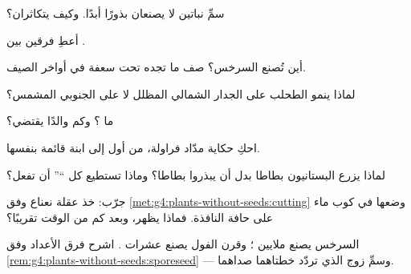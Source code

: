 \begin{exercise}[$\star$]\label{exo:g4:plants-without-seeds:1}
سمِّ نباتين لا يصنعان بذورًا أبدًا. وكيف يتكاثران؟
\end{exercise}

\begin{exercise}[$\star$]\label{exo:g4:plants-without-seeds:2}
أعطِ فرقين بين  .
\end{exercise}

\begin{exercise}[$\star$]\label{exo:g4:plants-without-seeds:3}
أين تُصنع  السرخس؟ صف ما تجده تحت سعفة في أواخر الصيف.
\end{exercise}

\begin{exercise}[$\star$]\label{exo:g4:plants-without-seeds:4}
لماذا ينمو الطحلب على الجدار الشمالي المظلل لا على الجنوبي
المشمس؟
\end{exercise}

\begin{exercise}[$\star$]\label{exo:g4:plants-without-seeds:5}
ما ؟ وكم والدًا يقتضي؟
\end{exercise}

\begin{exercise}[$\star$]\label{exo:g4:plants-without-seeds:6}
احكِ حكاية مدّاد فراولة، من أول  إلى  ابنة قائمة بنفسها.
\end{exercise}

\begin{exercise}[$\star$]\label{exo:g4:plants-without-seeds:7}
لماذا يزرع البستانيون بطاطا بدل أن يبذروا  بطاطا؟ وماذا
تستطيع كل ``'' أن تفعل؟
\end{exercise}

\begin{exercise}[$\star$]\label{exo:g4:plants-without-seeds:8}
جرّب: خذ عقلة نعناع وفق \cref{met:g4:plants-without-seeds:cutting}
وضعها في كوب ماء على حافة النافذة. فماذا يظهر، وبعد كم من الوقت
تقريبًا؟
\end{exercise}

\begin{exercise}[$\star\star$]\label{exo:g4:plants-without-seeds:9}
السرخس يصنع ملايين ؛ وقرن الفول يصنع عشرات . اشرح
فرق الأعداد وفق \cref{rem:g4:plants-without-seeds:sporeseed} ---
وسمِّ زوج  الذي تردّد خطتاهما صداهما.
\end{exercise}

